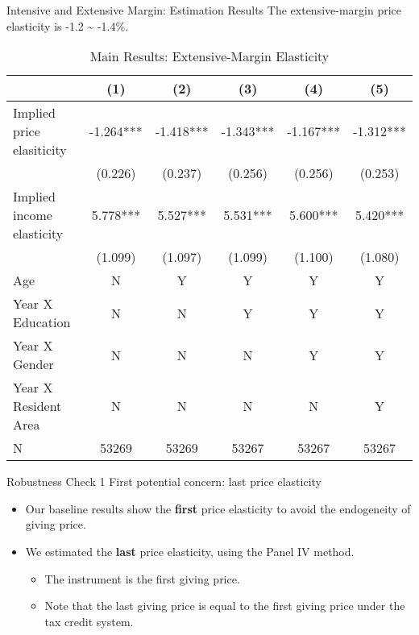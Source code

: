\documentclass[
  ignorenonframetext,
]{beamer}
\providecommand{\tightlist}{%
  \setlength{\itemsep}{0pt}\setlength{\parskip}{0pt}}
\begin{document}
\begin{frame}{Intensive and Extensive Margin: Estimation Results}
\protect\hypertarget{intensive-and-extensive-margin-estimation-results-1}{}
The extensive-margin price elasticity is -1.2 \textasciitilde{} -1.4\%.

\begin{table}

\caption{\label{tab:kableEstimateElasticityPart2Slide2}Main Results: Extensive-Margin Elasticity}
\centering
\fontsize{7}{9}\selectfont
\begin{tabular}[t]{lccccc}
\toprule
 & (1) & (2) & (3) & (4) & (5)\\
\midrule
Implied price elasiticity & -1.264*** & -1.418*** & -1.343*** & -1.167*** & -1.312***\\
 & (0.226) & (0.237) & (0.256) & (0.256) & (0.253)\\
Implied income elasticity & 5.778*** & 5.527*** & 5.531*** & 5.600*** & 5.420***\\
 & (1.099) & (1.097) & (1.099) & (1.100) & (1.080)\\
Age & N & Y & Y & Y & Y\\
Year X Education & N & N & Y & Y & Y\\
Year X Gender & N & N & N & Y & Y\\
Year X Resident Area & N & N & N & N & Y\\
N & 53269 & 53269 & 53267 & 53267 & 53267\\
\bottomrule
\end{tabular}
\end{table}
\end{frame}

\begin{frame}{Robustness Check 1}
\protect\hypertarget{robustness-check-1}{}
First potential concern: last price elasticity

\begin{itemize}
\tightlist
\item
  Our baseline results show the \textbf{first} price elasticity to avoid the endogeneity of giving price.
\item
  We estimated the \textbf{last} price elasticity, using the Panel IV method.

  \begin{itemize}
  \tightlist
  \item
    The instrument is the first giving price.
  \item
    Note that the last giving price is equal to the first giving price under the tax credit system.
  \end{itemize}
\end{itemize}
\end{frame}
\end{document}
